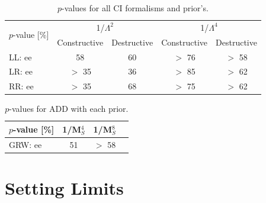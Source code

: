

    \begin {table}[h]
        \begin{center}
        \begin{tabular}{ | l | c | c | c | c | } 
            \hline
            \multirow{2}{*}{$p$-value [\%]} & \multicolumn{2}{c|}{1/$\Lambda^2$} & \multicolumn{2}{c|}{1/$\Lambda^4$} \\
            \cline{2-5}
            & Constructive & Destructive & Constructive & Destructive \\
            \hline
            LL: ee & 58 & 60 & $>$ 76 & $>$ 58 \\
            LR: ee & $>$ 35 & 36 & $>$ 85 & $>$ 62 \\
            RR: ee & $>$ 35 & 68 & $>$ 75 & $>$ 62 \\
            \hline
        \end{tabular}
        \caption{$p$-values for all CI formalisms and prior's.}
        \label{tab:pvalue_CI}
        \end{center}
    \end {table}


    \begin {table}[h]
        \begin{center}
        \begin{tabular}{ | l | c | c | c | } 
            \hline
            $p$-value [\%] & 1/M$_S^4$ & 1/M$_S^8$ \\
            \hline
            GRW: ee & 51 & $>$ 58 \\
            \hline
        \end{tabular}
        \caption{$p$-values for ADD with each prior.}
        \label{tab:pvalue_ADD}
        \end{center}
    \end {table}






\section{Setting Limits}
    
